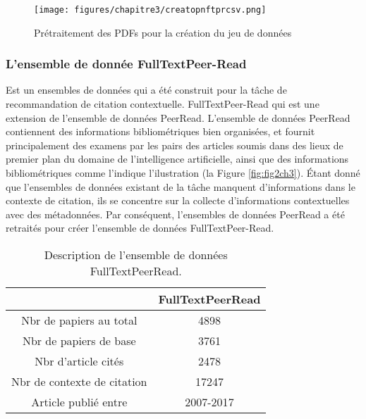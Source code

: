         \begin{figure}[H]
    	\begin{center}
    		\texttt{[image: figures/chapitre3/creatopnftprcsv.png]}
    	\end{center}
    	\caption {Prétraitement des PDFs pour la création du jeu de données}
    	\label{fig:fig1ch3}
        \end{figure} 
        
            \subsubsection{L'ensemble de donnée FullTextPeer-Read} Est un ensembles de données qui a été construit pour la tâche de recommandation de citation contextuelle. FullTextPeer-Read qui est une extension de l'ensemble de données PeerRead. L'ensemble de données PeerRead contiennent des informations bibliométriques bien organisées, et fournit principalement des examens par les pairs des articles soumis dans des lieux de premier plan du domaine de l'intelligence artificielle, ainsi que des informations bibliométriques comme l'indique l'ilustration (la Figure \ref{fig:fig2ch3}). Étant donné que l'ensembles de données existant de la tâche manquent d'informations dans le contexte de citation, ils se concentre sur la collecte d'informations contextuelles avec des métadonnées. Par conséquent, l'ensembles de données PeerRead a été retraités pour créer l'ensemble de données FullTextPeer-Read\cite{ch1ref8, peerreadgit}.
        
            
            \begin{table}[H]
            \centering
            \begin{tabular}{||c | c||} 
             \hline
               & FullTextPeerRead \\ [0.5ex] 
             \hline\hline
             Nbr de papiers au total      & 4898      \\ 
             Nbr de papiers de base       & 3761      \\
             Nbr d'article cités          & 2478      \\
             Nbr de contexte de citation  & 17247     \\
             Article publié entre         & 2007-2017 \\ [1ex] 
             \hline
            \end{tabular}
            \caption{Description de l'ensemble de données FullTextPeerRead. \cite{ch1ref8}}
            \label{table:1}
            \end{table}
              
